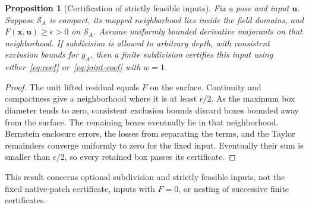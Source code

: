 \documentclass[journal]{IEEEtran}
\newtheorem{proposition}{Proposition}
\theoremstyle{definition}
\begin{document}
\begin{proposition}[Certification of strictly feasible inputs]\label{prop:complete}
Fix a pose and input $\mathbf u$. Suppose $\mathcal S_A$ is compact, its mapped neighborhood lies
inside the field domains, and $F(\mathbf x,\mathbf u)\ge\epsilon>0$ on $\mathcal S_A$.
Assume uniformly bounded derivative majorants on that neighborhood. If subdivision is allowed
to arbitrary depth, with consistent exclusion bounds for $g_A$, then a finite subdivision
certifies this input using either~\eqref{eq:coef} or~\eqref{eq:joint-coef} with $w=1$.
\end{proposition}
\begin{proof}
The unit lifted residual equals $F$ on the surface. Continuity and compactness give a neighborhood
where it is at least $\epsilon/2$. As the maximum box diameter tends to zero, consistent exclusion
bounds discard boxes bounded away from the surface. The remaining boxes eventually lie in that
neighborhood. Bernstein enclosure errors, the losses from separating the terms, and the Taylor
remainders converge uniformly to zero for the fixed input. Eventually their sum is smaller than
$\epsilon/2$, so every retained box passes its certificate.
\end{proof}
This result concerns optional subdivision and strictly feasible inputs, not the fixed
native-patch certificate, inputs with $F=0$, or nesting of successive finite certificates.

\end{document}
